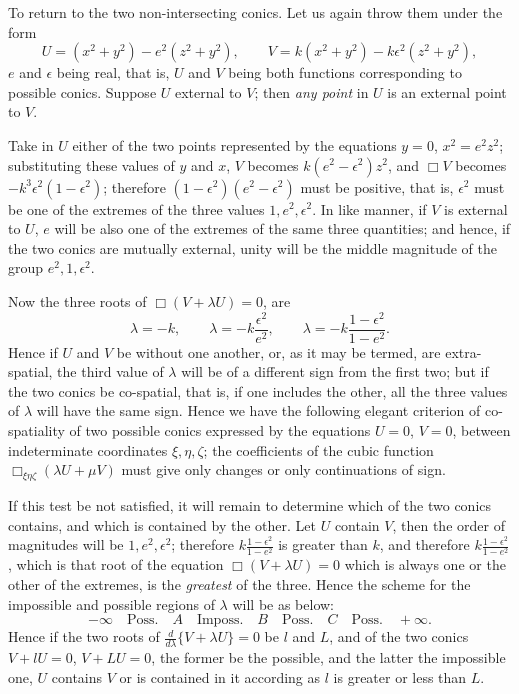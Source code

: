 \documentclass[11pt]{article}
\newcommand{\sourcepage}[1]{\marginpar{\scriptsize p.~#1}}
\begin{document}
\sourcepage{127}
To return to the two non-intersecting conics. Let us again throw them under the form
\[
U=(x^2+y^2)-e^2(z^2+y^2),\qquad
V=k(x^2+y^2)-k\epsilon^2(z^2+y^2),
\]
$e$ and $\epsilon$ being real, that is, $U$ and $V$ being both functions corresponding to possible conics. Suppose $U$ external to $V$; then \emph{any point} in $U$ is an external point to $V$.

Take in $U$ either of the two points represented by the equations $y=0$, $x^2=e^2z^2$; substituting these values of $y$ and $x$, $V$ becomes $k(e^2-\epsilon^2)z^2$, and $\Box V$ becomes $-k^3\epsilon^2(1-\epsilon^2)$; therefore $(1-\epsilon^2)(e^2-\epsilon^2)$ must be positive, that is, $\epsilon^2$ must be one of the extremes of the three values $1,e^2,\epsilon^2$. In like manner, if $V$ is external to $U$, $e$ will be also one of the extremes of the same three quantities; and hence, if the two conics are mutually external, unity will be the middle magnitude of the group $e^2,1,\epsilon^2$.

Now the three roots of $\Box(V+\lambda U)=0$, are
\[
\lambda=-k,\qquad
\lambda=-k\frac{\epsilon^2}{e^2},\qquad
\lambda=-k\frac{1-\epsilon^2}{1-e^2}.
\]
Hence if $U$ and $V$ be without one another, or, as it may be termed, are extra-spatial, the third value of $\lambda$ will be of a different sign from the first two; but if the two conics be co-spatial, that is, if one includes the other, all the three values of $\lambda$ will have the same sign. Hence we have the following elegant criterion of co-spatiality of two possible conics expressed by the equations $U=0$, $V=0$, between indeterminate coordinates $\xi,\eta,\zeta$; the coefficients of the cubic function $\Box_{\xi\eta\zeta}(\lambda U+\mu V)$ must give only changes or only continuations of sign.

If this test be not satisfied, it will remain to determine which of the two conics contains, and which is contained by the other. Let $U$ contain $V$, then the order of magnitudes will be $1,e^2,\epsilon^2$; therefore $k\frac{1-\epsilon^2}{1-e^2}$ is greater than $k$, and therefore $k\frac{1-\epsilon^2}{1-e^2}$, which is that root of the equation $\Box(V+\lambda U)=0$ which is always one or the other of the extremes, is the \emph{greatest} of the three. Hence the scheme for the impossible and possible regions of $\lambda$ will be as below:
\[
-\infty\quad\text{Poss.}\quad A\quad\text{Imposs.}\quad B\quad\text{Poss.}\quad C\quad\text{Poss.}\quad+\infty.
\]
Hence if the two roots of $\frac{d}{d\lambda}\{V+\lambda U\}=0$ be $l$ and $L$, and of the two conics $V+lU=0$, $V+LU=0$, the former be the possible, and the latter the impossible one, $U$ contains $V$ or is contained in it according as $l$ is greater or less than $L$.
\end{document}
